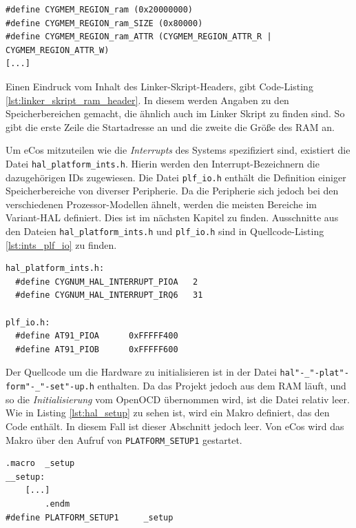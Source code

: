 \documentclass[
  a4paper,					%
  twoside,
  DIV=calc,     				%
  bibliography=totoc,
  cleardoublepage=empty,
  ngerman,     					%
  final       					%
]{scrbook}
\begin{document}
\begin{lstlisting}[frame=single, float, caption={Linker-Skript RAM Header}, label={lst:linker_skript_ram_header}]
#define CYGMEM_REGION_ram (0x20000000)
#define CYGMEM_REGION_ram_SIZE (0x80000)
#define CYGMEM_REGION_ram_ATTR (CYGMEM_REGION_ATTR_R | CYGMEM_REGION_ATTR_W)
[...]
\end{lstlisting}

Einen Eindruck vom Inhalt des Linker-Skript-Headers, gibt Code-Listing \ref{lst:linker_skript_ram_header}. In diesem werden Angaben zu den Speicherbereichen gemacht, die ähnlich auch im Linker Skript zu finden sind. So gibt die erste Zeile die Startadresse an und die zweite die Größe des RAM an.

Um eCos mitzuteilen wie die \emph{Interrupts} des Systems spezifiziert sind, existiert die Datei \texttt{hal\_platform\_ints.h}. Hierin werden den Interrupt-Bezeichnern die dazugehörigen IDs zugewiesen. Die Datei \texttt{plf\_io.h} enthält die Definition einiger Speicherbereiche von diverser Peripherie. Da die Peripherie sich jedoch bei den verschiedenen Prozessor-Modellen ähnelt, werden die meisten Bereiche im Variant-HAL definiert. Dies ist im nächsten Kapitel zu finden. Ausschnitte aus den Dateien \texttt{hal\_platform\_ints.h} und \texttt{plf\_io.h} sind in Quellcode-Listing \ref{lst:ints_plf_io} zu finden.

\begin{lstlisting}[frame=single, float, caption={hal\_platform\_ints.h und plf\_io.h}, label={lst:ints_plf_io}]
hal_platform_ints.h:
  #define CYGNUM_HAL_INTERRUPT_PIOA   2
  #define CYGNUM_HAL_INTERRUPT_IRQ6   31

plf_io.h:
  #define AT91_PIOA      0xFFFFF400
  #define AT91_PIOB      0xFFFFF600
\end{lstlisting}

Der Quellcode um die Hardware zu initialisieren ist in der Datei \texttt{hal"-\_"-plat"-form"-\_"-set"-up.h} enthalten. Da das Projekt jedoch aus dem RAM läuft, und so die \emph{Initialisierung} vom OpenOCD übernommen wird, ist die Datei relativ leer. Wie in Listing \ref{lst:hal_setup} zu sehen ist, wird ein Makro definiert, das den Code enthält. In diesem Fall ist dieser Abschnitt jedoch leer. Von eCos wird das Makro über den Aufruf von \texttt{PLATFORM\_SETUP1} gestartet. 

\begin{lstlisting}[frame=single, float, caption={hal\_platform\_setup.h}, label={lst:hal_setup}]
        .macro  _setup
__setup:
	[...]
        .endm
#define PLATFORM_SETUP1     _setup
\end{lstlisting}
\end{document}
